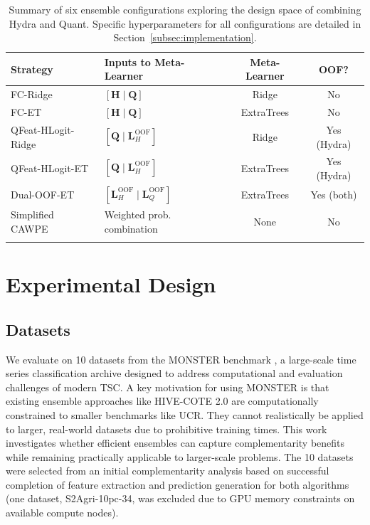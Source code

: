 \documentclass[pdflatex,sn-basic]{sn-jnl}           %
\theoremstyle{thmstyleone}%
\theoremstyle{thmstyletwo}%
\theoremstyle{thmstylethree}%
\begin{document}
\begin{table}[h]
\centering
\caption{Summary of six ensemble configurations exploring the design space of combining Hydra and Quant. Specific hyperparameters for all configurations are detailed in Section~\ref{subsec:implementation}.}\label{tab:ensemble_summary}
\small
\begin{tabular}{llcc}
\toprule
\textbf{Strategy} & \textbf{Inputs to Meta-Learner} & \textbf{Meta-Learner} & \textbf{OOF?} \\
\midrule
FC-Ridge & $[\mathbf{H} \mid \mathbf{Q}]$ & Ridge & No \\
FC-ET & $[\mathbf{H} \mid \mathbf{Q}]$ & ExtraTrees & No \\
QFeat-HLogit-Ridge & $[\mathbf{Q} \mid \mathbf{L}_H^{\text{OOF}}]$ & Ridge & Yes (Hydra) \\
QFeat-HLogit-ET & $[\mathbf{Q} \mid \mathbf{L}_H^{\text{OOF}}]$ & ExtraTrees & Yes (Hydra) \\
Dual-OOF-ET & $[\mathbf{L}_H^{\text{OOF}} \mid \mathbf{L}_Q^{\text{OOF}}]$ & ExtraTrees & Yes (both) \\
Simplified CAWPE & Weighted prob. combination & None & No \\
\botrule
\end{tabular}
\end{table}


\section{Experimental Design}\label{sec4}

\subsection{Datasets}

We evaluate on 10 datasets from the MONSTER benchmark \citep{monster}, a large-scale time series classification archive designed to address computational and evaluation challenges of modern TSC. A key motivation for using MONSTER is that existing ensemble approaches like HIVE-COTE 2.0 are computationally constrained to smaller benchmarks like UCR. They cannot realistically be applied to larger, real-world datasets due to prohibitive training times. This work investigates whether efficient ensembles can capture complementarity benefits while remaining practically applicable to larger-scale problems. The 10 datasets were selected from an initial complementarity analysis based on successful completion of feature extraction and prediction generation for both algorithms (one dataset, S2Agri-10pc-34, was excluded due to GPU memory constraints on available compute nodes).
\end{document}
